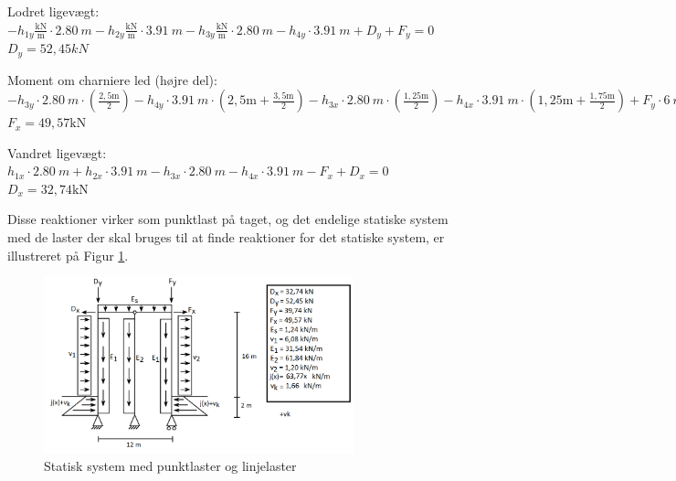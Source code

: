 \begin{center}
	Lodret ligevægt: $-h_{1y} \frac{\text{kN}}{\text{m}} \cdot \SI{2,80}{m} - h_{2y} \frac{\text{kN}}{\text{m}} \cdot \SI{3,91}{m} - h_{3y} \frac{\text{kN}}{\text{m}} \cdot \SI{2,80}{m} -  h_{4y} \cdot \SI{3,91}{m} + D_y + F_y = 0$ 
	\newline
	$D_y = 52,\!45 kN$
\end{center}

\begin{center}
	Moment om charniere led (højre del): $- h_{3y} \cdot \SI{2,80}{m} \cdot (\frac{2,5 \text{m}}{2}) - h_{4y} \cdot \SI{3,91}{m} \cdot (2,\!5 \text{m} + \frac{3,5 \text{m}}{2}) - h_{3x} \cdot \SI{2,80}{m} \cdot (\frac{1,25 \text{m}}{2}) - h_{4x} \cdot \SI{3,91}{m} \cdot (1,\!25 \text{m} + \frac{1,75 \text{m}}{2}) + F_y \cdot \SI{6}{m} - F_x \cdot \SI{3}{m} = 0$ 
	\newline
	$F_x = 49,\!57 \text{kN}$
\end{center}

\begin{center}
	Vandret ligevægt: $h_{1x} \cdot \SI{2,80}{m} + h_{2x} \cdot \SI{3,91}{m} - h_{3x} \cdot \SI{2,80}{m} - h_{4x} \cdot \SI{3,91}{m} - F_x + D_x = 0$
	\newline
	$D_x = 32,\!74 \text{kN}$
\end{center}

Disse reaktioner virker som punktlast på taget, og det endelige statiske system med de laster der skal bruges til at finde reaktioner for det statiske system, er illustreret på Figur \ref{fig:alle}. 

\begin{figure}[htbp]
	\centering
	\includegraphics[width=0.8\textwidth]{billeder/endeligesystemmedlaster.png}
	\caption{Statisk system med punktlaster og linjelaster}
	\label{fig:alle}
\end{figure}